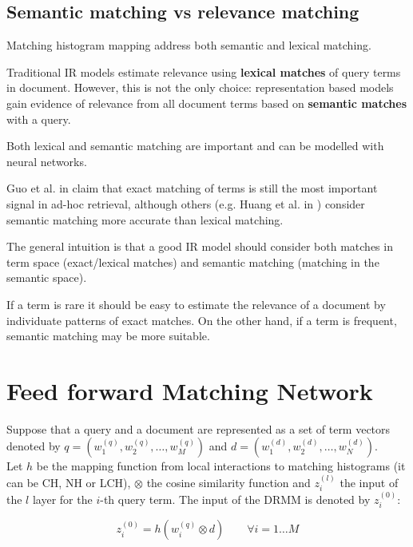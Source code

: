 \subsection{Semantic matching vs relevance matching}

Matching histogram mapping address both semantic and lexical matching.

Traditional IR models estimate relevance using \textbf{lexical matches} of query terms in document. However, this is not the only choice: representation based models gain evidence of relevance from all document terms based on \textbf{semantic matches} with a query.

Both lexical and semantic matching are important and can be modelled with neural networks.

Guo et al. in \cite{drmm} claim that exact matching of terms is still the most important signal in ad-hoc retrieval, although others (e.g. Huang et al. in \cite{dssm}) consider semantic matching more accurate than lexical matching.

The general intuition is that a good IR model should consider both matches in term space (exact/lexical matches) and semantic matching (matching in the semantic space).

If a term is rare it should be easy to estimate the relevance of a document by individuate patterns of exact matches. On the other hand, if a term is frequent, semantic matching may be more suitable.

\section{Feed forward Matching Network}

Suppose that a query and a document are represented as a set of term vectors denoted by $q = (w_1^{(q)}, w_2^{(q)}, \dots, w_M^{(q)})$
and $d = (w_1^{(d)}, w_2^{(d)}, \dots, w_N^{(d)})$.\\

Let $h$ be the mapping function from local interactions to matching histograms (it can be CH, NH or LCH), $\otimes$ the cosine similarity function and $z_i^{(l)}$ the input of the $l$ layer for the $i$-th query term. The input of the DRMM is denoted by $z_i^{(0)}$:

\begin{equation}
\label{eq:inpFst}
\tag{Input to the first layer of ffnn}
z_i^{(0)} = h(w_i^{(q)} \otimes d) \qquad \forall i = 1 \dots M
\end{equation}

